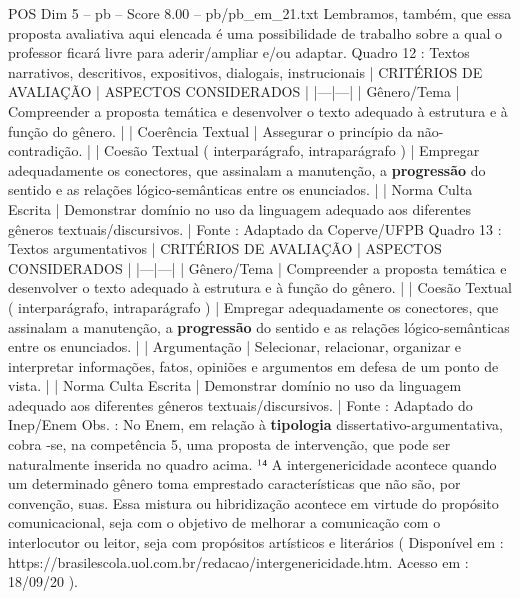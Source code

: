 \begin{textsample}{POS Dim 5 – pb – Score 8.00 – pb/pb\_em\_21.txt}
Lembramos, também, que essa proposta avaliativa aqui elencada é uma possibilidade de trabalho sobre a qual o professor ficará livre para aderir/ampliar e/ou adaptar.
Quadro 12 : Textos narrativos, descritivos, expositivos, dialogais, instrucionais | CRITÉRIOS DE AVALIAÇÃO | ASPECTOS CONSIDERADOS | |---|---| | Gênero/Tema | Compreender a proposta temática e desenvolver o texto adequado à estrutura e à função do gênero. | | Coerência Textual | Assegurar o princípio da não-contradição. | | Coesão Textual ( interparágrafo, intraparágrafo ) | Empregar adequadamente os conectores, que assinalam a manutenção, a \textbf{progressão} do sentido e as relações lógico-semânticas entre os enunciados. | | Norma Culta Escrita | Demonstrar domínio no uso da linguagem adequado aos diferentes gêneros textuais/discursivos. | Fonte : Adaptado da Coperve/UFPB Quadro 13 : Textos argumentativos | CRITÉRIOS DE AVALIAÇÃO | ASPECTOS CONSIDERADOS | |---|---| | Gênero/Tema | Compreender a proposta temática e desenvolver o texto adequado à estrutura e à função do gênero. | | Coesão Textual ( interparágrafo, intraparágrafo ) | Empregar adequadamente os conectores, que assinalam a manutenção, a \textbf{progressão} do sentido e as relações lógico-semânticas entre os enunciados. | | Argumentação | Selecionar, relacionar, organizar e interpretar informações, fatos, opiniões e argumentos em defesa de um ponto de vista. | | Norma Culta Escrita | Demonstrar domínio no uso da linguagem adequado aos diferentes gêneros textuais/discursivos. | Fonte : Adaptado do Inep/Enem Obs. : No Enem, em relação à \textbf{tipologia} dissertativo-argumentativa, cobra -se, na competência 5, uma proposta de intervenção, que pode ser naturalmente inserida no quadro acima. ¹⁴ A intergenericidade acontece quando um determinado gênero toma emprestado características que não são, por convenção, suas.
Essa mistura ou hibridização acontece em virtude do propósito comunicacional, seja com o objetivo de melhorar a comunicação com o interlocutor ou leitor, seja com propósitos artísticos e literários ( Disponível em : https://brasilescola.uol.com.br/redacao/intergenericidade.htm.
Acesso em : 18/09/20 ).

\end{textsample}
